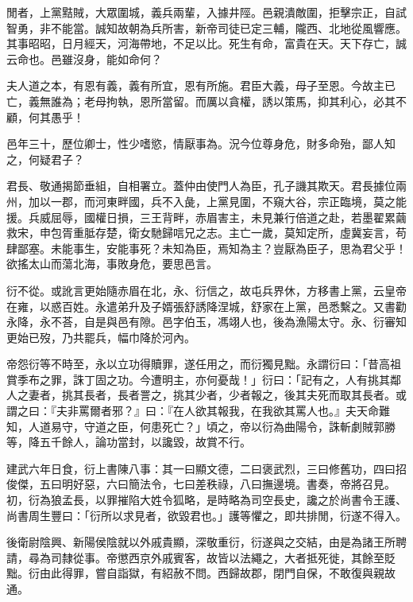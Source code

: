 \begin{pinyinscope}
閒者，上黨黠賊，大眾圍城，義兵兩輩，入據井陘。邑親潰敵圍，拒擊宗正，自試智勇，非不能當。誠知故朝為兵所害，新帝司徒已定三輔，隴西、北地從風響應。其事昭昭，日月經天，河海帶地，不足以比。死生有命，富貴在天。天下存亡，誠云命也。邑雖沒身，能如命何？

夫人道之本，有恩有義，義有所宜，恩有所施。君臣大義，母子至恩。今故主已亡，義無誰為；老母拘執，恩所當留。而厲以貪權，誘以策馬，抑其利心，必其不顧，何其愚乎！

邑年三十，歷位卿士，性少嗜慾，情厭事為。況今位尊身危，財多命殆，鄙人知之，何疑君子？

君長、敬通揭節垂組，自相署立。蓋仲由使門人為臣，孔子譏其欺天。君長據位兩州，加以一郡，而河東畔國，兵不入彘，上黨見圍，不窺大谷，宗正臨境，莫之能援。兵威屈辱，國權日損，三王背畔，赤眉害主，未見兼行倍道之赴，若墨翟累繭救宋，申包胥重胝存楚，衛女馳歸唁兄之志。主亡一歲，莫知定所，虛冀妄言，苟肆鄙塞。未能事生，安能事死？未知為臣，焉知為主？豈厭為臣子，思為君父乎！欲搖太山而蕩北海，事敗身危，要思邑言。

衍不從。或訛言更始隨赤眉在北，永、衍信之，故屯兵界休，方移書上黨，云皇帝在雍，以惑百姓。永遣弟升及子婿張舒誘降涅城，舒家在上黨，邑悉繫之。又書勸永降，永不荅，自是與邑有隙。邑字伯玉，馮翊人也，後為漁陽太守。永、衍審知更始已歿，乃共罷兵，幅巾降於河內。

帝怨衍等不時至，永以立功得贖罪，遂任用之，而衍獨見黜。永謂衍曰：「昔高祖賞季布之罪，誅丁固之功。今遭明主，亦何憂哉！」衍曰：「記有之，人有挑其鄰人之妻者，挑其長者，長者詈之，挑其少者，少者報之，後其夫死而取其長者。或謂之曰：『夫非罵爾者邪？』曰：『在人欲其報我，在我欲其罵人也。』夫天命難知，人道易守，守道之臣，何患死亡？」頃之，帝以衍為曲陽令，誅斬劇賊郭勝等，降五千餘人，論功當封，以讒毀，故賞不行。

建武六年日食，衍上書陳八事：其一曰顯文德，二曰褒武烈，三曰修舊功，四曰招俊傑，五曰明好惡，六曰簡法令，七曰差秩祿，八曰撫邊境。書奏，帝將召見。初，衍為狼孟長，以罪摧陷大姓令狐略，是時略為司空長史，讒之於尚書令王護、尚書周生豐曰：「衍所以求見者，欲毀君也。」護等懼之，即共排閒，衍遂不得入。

後衛尉陰興、新陽侯陰就以外戚貴顯，深敬重衍，衍遂與之交結，由是為諸王所聘請，尋為司隸從事。帝懲西京外戚賓客，故皆以法繩之，大者抵死徙，其餘至貶黜。衍由此得罪，嘗自詣獄，有紹赦不問。西歸故郡，閉門自保，不敢復與親故通。


\end{pinyinscope}